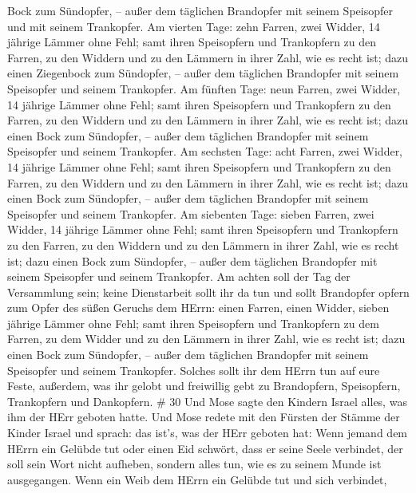Bock zum Sündopfer, -- außer dem täglichen Brandopfer mit seinem
Speisopfer und mit seinem Trankopfer.  Am vierten Tage:
zehn Farren, zwei Widder, 14 jährige Lämmer ohne Fehl; 
samt ihren Speisopfern und Trankopfern zu den Farren, zu den Widdern und
zu den Lämmern in ihrer Zahl, wie es recht ist;  dazu einen
Ziegenbock zum Sündopfer, -- außer dem täglichen Brandopfer mit seinem
Speisopfer und seinem Trankopfer.  Am fünften Tage: neun
Farren, zwei Widder, 14 jährige Lämmer ohne Fehl;  samt
ihren Speisopfern und Trankopfern zu den Farren, zu den Widdern und zu
den Lämmern in ihrer Zahl, wie es recht ist;  dazu einen
Bock zum Sündopfer, -- außer dem täglichen Brandopfer mit seinem
Speisopfer und seinem Trankopfer.  Am sechsten Tage: acht
Farren, zwei Widder, 14 jährige Lämmer ohne Fehl;  samt
ihren Speisopfern und Trankopfern zu den Farren, zu den Widdern und zu
den Lämmern in ihrer Zahl, wie es recht ist;  dazu einen
Bock zum Sündopfer, -- außer dem täglichen Brandopfer mit seinem
Speisopfer und seinem Trankopfer.  Am siebenten Tage:
sieben Farren, zwei Widder, 14 jährige Lämmer ohne Fehl; 
samt ihren Speisopfern und Trankopfern zu den Farren, zu den Widdern und
zu den Lämmern in ihrer Zahl, wie es recht ist;  dazu einen
Bock zum Sündopfer, -- außer dem täglichen Brandopfer mit seinem
Speisopfer und seinem Trankopfer.  Am achten soll der Tag
der Versammlung sein; keine Dienstarbeit sollt ihr da tun 
und sollt Brandopfer opfern zum Opfer des süßen Geruchs dem HErrn: einen
Farren, einen Widder, sieben jährige Lämmer ohne Fehl; 
samt ihren Speisopfern und Trankopfern zu dem Farren, zu dem Widder und
zu den Lämmern in ihrer Zahl, wie es recht ist;  dazu einen
Bock zum Sündopfer, -- außer dem täglichen Brandopfer mit seinem
Speisopfer und seinem Trankopfer.  Solches sollt ihr dem
HErrn tun auf eure Feste, außerdem, was ihr gelobt und freiwillig gebt
zu Brandopfern, Speisopfern, Trankopfern und Dankopfern. \# 30
 Und Mose sagte den Kindern Israel alles, was ihm der HErr
geboten hatte.  Und Mose redete mit den Fürsten der Stämme
der Kinder Israel und sprach: das ist's, was der HErr geboten hat:
 Wenn jemand dem HErrn ein Gelübde tut oder einen Eid
schwört, dass er seine Seele verbindet, der soll sein Wort nicht
aufheben, sondern alles tun, wie es zu seinem Munde ist ausgegangen.
 Wenn ein Weib dem HErrn ein Gelübde tut und sich verbindet,
